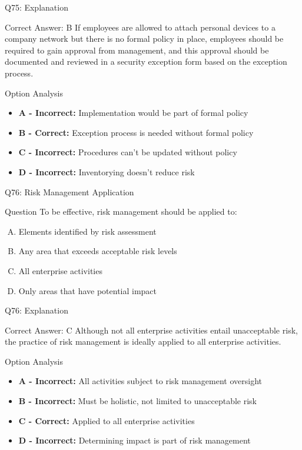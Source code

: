 \documentclass{beamer}
\begin{document}
	\begin{frame}{Q75: Explanation}
		\begin{block}{Correct Answer: B}
			If employees are allowed to attach personal devices to a company network but there is no formal policy in place, employees should be required to gain approval from management, and this approval should be documented and reviewed in a security exception form based on the exception process.
		\end{block}
		\begin{block}{Option Analysis}
			\begin{itemize}
				\item \textbf{A - Incorrect:} Implementation would be part of formal policy
				\item \textbf{B - Correct:} Exception process is needed without formal policy
				\item \textbf{C - Incorrect:} Procedures can't be updated without policy
				\item \textbf{D - Incorrect:} Inventorying doesn't reduce risk
			\end{itemize}
		\end{block}
	\end{frame}
	
	\begin{frame}{Q76: Risk Management Application}
		\begin{block}{Question}
			To be effective, risk management should be applied to:
		\end{block}
		\begin{enumerate}[(A)]
			\item Elements identified by risk assessment
			\item Any area that exceeds acceptable risk levels
			\item All enterprise activities
			\item Only areas that have potential impact
		\end{enumerate}
	\end{frame}
	
	\begin{frame}{Q76: Explanation}
		\begin{block}{Correct Answer: C}
			Although not all enterprise activities entail unacceptable risk, the practice of risk management is ideally applied to all enterprise activities.
		\end{block}
		\begin{block}{Option Analysis}
			\begin{itemize}
				\item \textbf{A - Incorrect:} All activities subject to risk management oversight
				\item \textbf{B - Incorrect:} Must be holistic, not limited to unacceptable risk
				\item \textbf{C - Correct:} Applied to all enterprise activities
				\item \textbf{D - Incorrect:} Determining impact is part of risk management
			\end{itemize}
		\end{block}
	\end{frame}
	
\end{document}
